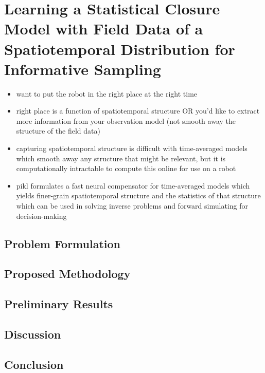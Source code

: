 \chapter{Learning a Statistical Closure Model with Field Data of a Spatiotemporal Distribution for Informative Sampling}
\label{chap:future}
\begin{itemize}
    \item want to put the robot in the right place at the right time
    \item right place is a function of spatiotemporal structure OR you'd like to extract more information from your observation model (not smooth away the structure of the field data)
    \item capturing spatiotemporal structure is difficult with time-averaged models which smooth away any structure that might be relevant, but it is computationally intractable to compute this online for use on a robot
    \item pikl formulates a fast neural compensator for time-averaged models which yields finer-grain spatiotemporal structure and the statistics of that structure which can be used in solving inverse problems and forward simulating for decision-making 
\end{itemize}

\section{Problem Formulation}

\section{Proposed Methodology}

\section{Preliminary Results}

\section{Discussion}

\section{Conclusion}
